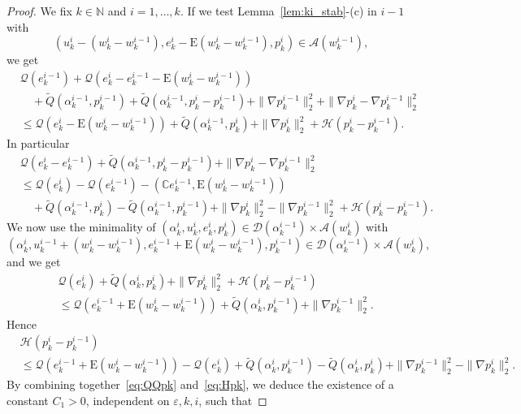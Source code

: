 \documentclass[reqno]{amsart}
\theoremstyle{definition}
\numberwithin{equation}{section}
\def\N {\mathbb N}
\def\C {\mathbb C}
\def\EE {\mathrm{E}}
\begin{document}
\begin{proof}
We fix $k\in\N$ and $i=1,\dots,k$. If we test Lemma~\ref{lem:ki_stab}-(c) in $i-1$ with
\begin{equation*}
(u_k^i-(w_k^i-w_k^{i-1}),e_k^i-\EE(w_k^i-w_k^{i-1}),p_k^i)\in \mathcal A(w_k^{i-1}),
\end{equation*}
we get
\begin{align*}
&\mathcal Q(e_k^{i-1})+\mathcal Q(e_k^i-e_k^{i-1}-\EE(w_k^i-w_k^{i-1}))\\
&\quad+\tilde Q(\alpha_k^{i-1},p_k^{i-1})+\tilde Q(\alpha_k^{i-1},p_k^i-p_k^{i-1})+\|\nabla p_k^{i-1}\|_2^2+\|\nabla p_k^i-\nabla p_k^{i-1}\|_2^2\\
&\le \mathcal Q(e_k^i-\EE(w_k^i-w_k^{i-1}))+\tilde Q(\alpha_k^{i-1},p_k^i)+\|\nabla p_k^i\|_2^2+\mathcal H(p_k^i-p_k^{i-1}).
\end{align*}
In particular
\begin{align}
&\mathcal Q(e_k^i-e_k^{i-1})+\tilde Q(\alpha_k^{i-1},p_k^i-p_k^{i-1})+\|\nabla p_k^i-\nabla p_k^{i-1}\|_2^2\nonumber\\
&\le \mathcal Q(e_k^i)-\mathcal Q(e_k^{i-1})-(\C e_k^{i-1},\EE(w_k^i-w_k^{i-1}))\nonumber\\
&\quad+\tilde Q(\alpha_k^{i-1},p_k^i)-\tilde Q(\alpha_k^{i-1},p_k^{i-1})+\|\nabla p_k^i\|_2^2-\|\nabla p_k^{i-1}\|_2^2+\mathcal H(p_k^i-p_k^{i-1}).\label{eq:QQpk}
\end{align}
We now use the minimality of $(\alpha_k^i,u_k^i,e_k^i,p_k^i)\in \mathcal D(\alpha_k^{i-1})\times \mathcal A(w_k^i)$ with
\begin{equation*}
(\alpha_k^i,u_k^{i-1}+(w_k^i-w_k^{i-1}),e_k^{i-1}+\EE(w_k^i-w_k^{i-1}),p_k^{i-1})\in \mathcal D(\alpha_k^{i-1})\times \mathcal A(w_k^i),
\end{equation*}
and we get
\begin{align*}
&\mathcal Q(e_k^i)+\tilde Q(\alpha_k^i,p_k^i)+\|\nabla p_k^i\|_2^2+\mathcal H(p_k^i-p_k^{i-1})\\
&\le \mathcal Q(e_k^{i-1}+\EE(w_k^i-w_k^{i-1}))+\tilde Q(\alpha_k^i,p_k^{i-1})+\|\nabla p_k^{i-1}\|_2^2.
\end{align*}
Hence
\begin{align}
&\mathcal H(p_k^i-p_k^{i-1})\nonumber\\
&\le \mathcal Q(e_k^{i-1}+\EE(w_k^i-w_k^{i-1}))-\mathcal Q(e_k^i)+\tilde Q(\alpha_k^i,p_k^{i-1})-\tilde Q(\alpha_k^i,p_k^i)+\|\nabla p_k^{i-1}\|_2^2-\|\nabla p_k^i\|_2^2.\label{eq:Hpk}
\end{align}
By combining together~\eqref{eq:QQpk} and~\eqref{eq:Hpk}, we deduce the existence of a constant $C_1>0$, independent on $\varepsilon,k,i$, such that

\end{proof}
\end{document}
